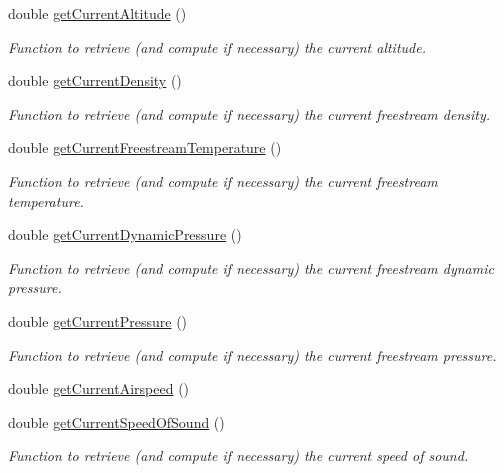 \begin{DoxyCompactItemize}
double \hyperlink{classtudat_1_1aerodynamics_1_1FlightConditions_a9be363eadc6441e9f83ede3110f7399e}{get\+Current\+Altitude} ()
\begin{DoxyCompactList}\small\item\em Function to retrieve (and compute if necessary) the current altitude. \end{DoxyCompactList}\item 
double \hyperlink{classtudat_1_1aerodynamics_1_1FlightConditions_a7cea9d3de862973c734b27a9d8fc9f63}{get\+Current\+Density} ()
\begin{DoxyCompactList}\small\item\em Function to retrieve (and compute if necessary) the current freestream density. \end{DoxyCompactList}\item 
double \hyperlink{classtudat_1_1aerodynamics_1_1FlightConditions_af2d0fa06499fae7521ac806a16ebbd0b}{get\+Current\+Freestream\+Temperature} ()
\begin{DoxyCompactList}\small\item\em Function to retrieve (and compute if necessary) the current freestream temperature. \end{DoxyCompactList}\item 
double \hyperlink{classtudat_1_1aerodynamics_1_1FlightConditions_acbf90152f6cb45e3366fb08a2bb73c8f}{get\+Current\+Dynamic\+Pressure} ()
\begin{DoxyCompactList}\small\item\em Function to retrieve (and compute if necessary) the current freestream dynamic pressure. \end{DoxyCompactList}\item 
double \hyperlink{classtudat_1_1aerodynamics_1_1FlightConditions_a9143a4ceb811cd9d911d603a58e036ed}{get\+Current\+Pressure} ()
\begin{DoxyCompactList}\small\item\em Function to retrieve (and compute if necessary) the current freestream pressure. \end{DoxyCompactList}\item 
double \hyperlink{classtudat_1_1aerodynamics_1_1FlightConditions_a92503b7936f9baf95e246d65e969ccee}{get\+Current\+Airspeed} ()
\item 
double \hyperlink{classtudat_1_1aerodynamics_1_1FlightConditions_a9d2787d6c3678aa01c050f81b79b709f}{get\+Current\+Speed\+Of\+Sound} ()
\begin{DoxyCompactList}\small\item\em Function to retrieve (and compute if necessary) the current speed of sound. \end{DoxyCompactList}\item 

\end{DoxyCompactItemize}
